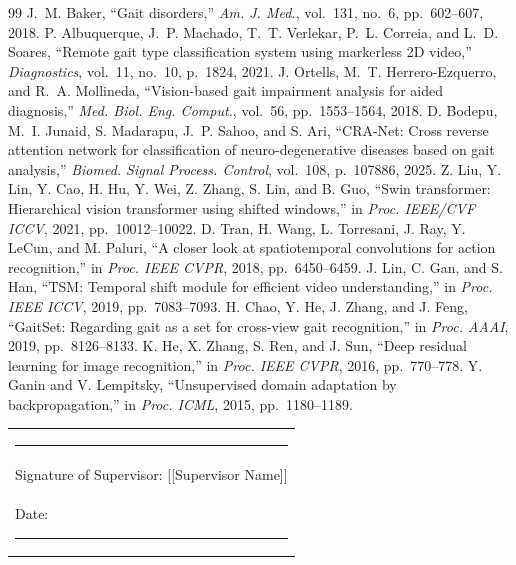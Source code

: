 \documentclass[conference]{IEEEtran}
\begin{document}
\begin{thebibliography}{99}
\footnotesize
{} J.~M. Baker, ``Gait disorders,'' \emph{Am. J. Med.},
vol.~131, no.~6, pp.~602--607, 2018.
 P. Albuquerque, J.~P. Machado, T.~T. Verlekar,
P.~L. Correia, and L.~D. Soares, ``Remote gait type classification system using
markerless 2D video,'' \emph{Diagnostics}, vol.~11, no.~10, p.~1824, 2021.
 J. Ortells, M.~T. Herrero-Ezquerro, and R.~A. Mollineda,
``Vision-based gait impairment analysis for aided diagnosis,'' \emph{Med. Biol.
Eng. Comput.}, vol.~56, pp.~1553--1564, 2018.
 D. Bodepu, M.~I. Junaid, S. Madarapu, J.~P. Sahoo, and
S. Ari, ``CRA-Net: Cross reverse attention network for classification of
neuro-degenerative diseases based on gait analysis,'' \emph{Biomed. Signal
Process. Control}, vol.~108, p.~107886, 2025.
 Z. Liu, Y. Lin, Y. Cao, H. Hu, Y. Wei, Z. Zhang, S. Lin,
and B. Guo, ``Swin transformer: Hierarchical vision transformer using shifted
windows,'' in \emph{Proc. IEEE/CVF ICCV}, 2021, pp.~10012--10022.
 D. Tran, H. Wang, L. Torresani, J. Ray, Y. LeCun, and
M. Paluri, ``A closer look at spatiotemporal convolutions for action
recognition,'' in \emph{Proc. IEEE CVPR}, 2018, pp.~6450--6459.
 J. Lin, C. Gan, and S. Han, ``TSM: Temporal shift module
for efficient video understanding,'' in \emph{Proc. IEEE ICCV}, 2019,
pp.~7083--7093.
 H. Chao, Y. He, J. Zhang, and J. Feng, ``GaitSet:
Regarding gait as a set for cross-view gait recognition,'' in \emph{Proc.
AAAI}, 2019, pp.~8126--8133.
 K. He, X. Zhang, S. Ren, and J. Sun, ``Deep residual
learning for image recognition,'' in \emph{Proc. IEEE CVPR}, 2016, pp.~770--778.
 Y. Ganin and V. Lempitsky, ``Unsupervised domain adaptation
by backpropagation,'' in \emph{Proc. ICML}, 2015, pp.~1180--1189.
\end{thebibliography}

\vspace{4mm}
\noindent\begin{tabular}{@{}l@{}}
\rule{4.5cm}{0.4pt}\\
Signature of Supervisor: [[Supervisor Name]]\\
Date: \rule{2.5cm}{0.4pt}
\end{tabular}
\end{document}
